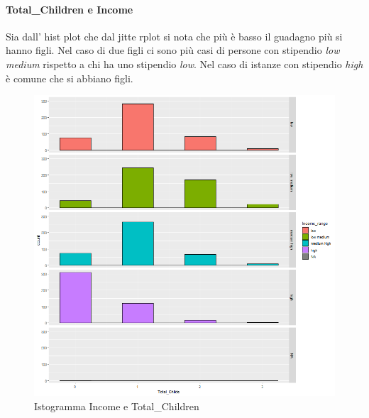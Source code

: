 \documentclass[letterpaper,11pt]{article}
\begin{document}
\newpage

\paragraph{Total\_Children e Income}

Sia dall' hist plot che dal jitte rplot si nota che più è basso il guadagno più si hanno figli. Nel caso di due figli ci sono più casi di persone con stipendio \textit{low medium} rispetto a chi ha uno stipendio \textit{low}. 
Nel caso di istanze con stipendio \textit{high} è comune che si abbiano figli. 

\begin{figure}[h!]
\begin{minipage}[c]{0.4\linewidth}
\includegraphics[width=\linewidth]{Img/EDA/EDA020.png}
\caption{Istogramma Income e Total\_Children}
\label{fig:IstogrammaTcIncome}
\end{minipage}
\hfill
\begin{minipage}[c]{0.4\linewidth}

\end{minipage}
\end{figure}
\end{document}
